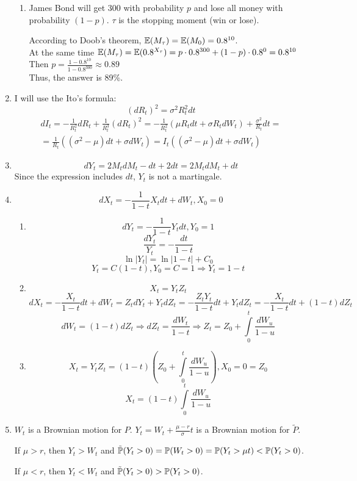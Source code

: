 \documentclass[12pt, a4paper]{article}
\begin{document}
\begin{enumerate}
\begin{enumerate}
\item James Bond will get 300 with probability $p$ and lose all money with probability $(1-p)$. $\tau$ is the stopping moment (win or lose).

According to Doob's theorem, $\E(M_{\tau})=\E(M_0)=0.8^{10}$.\\
At the same time $\E(M_{\tau})=\E(0.8^{X_{\tau}})=p\cdot 0.8^{300}+(1-p)\cdot 0.8^0=0.8^{10}$\\
Then $p=\frac{1-0.8^{10}}{1-0.8^{300}}\approx0.89$\\
Thus, the answer is 89\%.
\end{enumerate}

\item I will use the Ito's formula:
\[
(dR_t)^2=\sigma^2R_t^2dt
\]
\begin{multline}
dI_t=-\frac{1}{R_t^2}dR_t+\frac{1}{R_t^3} (dR_t)^2=-\frac{1}{R_t^2}(\mu R_t dt+\sigma R_tdW_t)+\frac{\sigma^2}{R_t}dt=\\
=\frac{1}{R_t}((\sigma^2-\mu)dt+\sigma dW_t)=I_t((\sigma^2-\mu)dt+\sigma dW_t)
\end{multline}

\item
\[
dY_t=2M_tdM_t-dt+2dt=2M_tdM_t+dt
\]
Since the expression includes $dt$, $Y_t$ is not a martingale.

\item
\[
dX_t=-\frac{1}{1-t}X_tdt+dW_t,X_0=0
\]
\begin{enumerate}
\item 
\[
dY_t=-\frac{1}{1-t}Y_tdt, Y_0=1
\]
\[
\frac{dY_t}{Y_t}=-\frac{dt}{1-t}
\]
\[
\ln|Y_t|=\ln|1-t|+C_0
\]
\[
Y_t=C(1-t), Y_0=C=1\Rightarrow Y_t=1-t
\]
\item 
\[
X_t=Y_tZ_t
\]
\[
dX_t=-\frac{X_t}{1-t}dt+dW_t=Z_tdY_t+Y_tdZ_t=-\frac{Z_tY_t}{1-t}dt+Y_tdZ_t=-\frac{X_t}{1-t}dt+(1-t)dZ_t
\]
\[
dW_t=(1-t)dZ_t\Rightarrow dZ_t=\frac{dW_t}{1-t}\Rightarrow Z_t=Z_0+\int\limits_0^t \frac{dW_u}{1-u}
\]
\item
\[
X_t=Y_tZ_t=(1-t)\left(Z_0+\int\limits_0^t \frac{dW_u}{1-u}\right), X_0=0=Z_0
\]
\[
X_t=(1-t)\int\limits_0^t \frac{dW_u}{1-u}
\]
\end{enumerate}

\item
$W_t$ is a Brownian motion for $P$. $Y_t=W_t+\frac{\mu-r}{\sigma} t$ is a Brownian motion for $\tilde P$. 

If $\mu>r$, then $Y_t>W_t$ and $\tilde \P(Y_t>0)=\P(W_t>0)=\P(Y_t>\mu t)<\P(Y_t>0)$.

If $\mu<r$, then $Y_t<W_t$ and $\tilde \P(Y_t>0)>\P(Y_t>0)$.


\end{enumerate}
\end{document}
